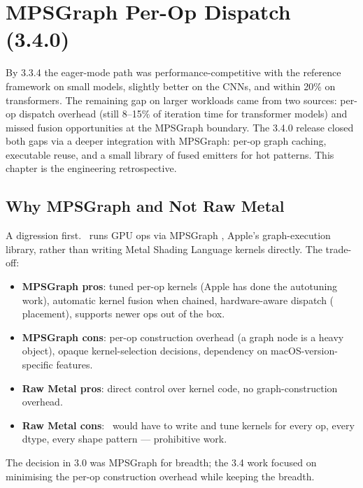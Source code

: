 \chapter{MPSGraph Per-Op Dispatch (3.4.0)}
\label{ch:mpsgraph_dispatch}

By 3.3.4 the eager-mode path was performance-competitive with
the reference framework on small models, slightly better on
the CNNs, and within 20\% on transformers. The remaining gap on
larger workloads came from two sources: per-op dispatch
overhead (still 8--15\% of iteration time for transformer
models) and missed fusion opportunities at the MPSGraph
boundary. The 3.4.0 release closed both gaps via a deeper
integration with MPSGraph: per-op graph caching, executable
reuse, and a small library of fused emitters for hot patterns.
This chapter is the engineering retrospective.

\section{Why MPSGraph and Not Raw Metal}
\label{sec:mpsgraph_dispatch:why_mpsgraph}

A digression first. \Lucid\ runs GPU ops via MPSGraph
\cite{apple_mpsgraph}, Apple's graph-execution library, rather
than writing Metal Shading Language kernels directly. The
trade-off:

\begin{itemize}
  \item \textbf{MPSGraph pros}: tuned per-op kernels (Apple
    has done the autotuning work), automatic kernel fusion
    when chained, hardware-aware dispatch
    ( placement), supports newer ops out of
    the box.
  \item \textbf{MPSGraph cons}: per-op construction overhead
    (a graph node is a heavy object), opaque kernel-selection
    decisions, dependency on macOS-version-specific features.
  \item \textbf{Raw Metal pros}: direct control over kernel
    code, no graph-construction overhead.
  \item \textbf{Raw Metal cons}: \Lucid\ would have to write
    and tune kernels for every op, every dtype, every shape
    pattern --- prohibitive work.
\end{itemize}

The decision in 3.0 was MPSGraph for breadth; the 3.4 work
focused on minimising the per-op construction overhead while
keeping the breadth.

